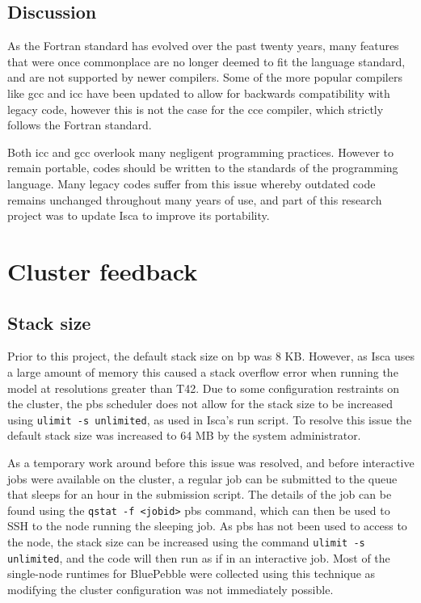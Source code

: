 \documentclass[a4paper,11pt]{report}
\begin{document}
\subsection{Discussion}
As the Fortran standard has evolved over the past twenty years, many features that were once commonplace are no longer deemed to fit the language standard, and are not supported by newer compilers. Some of the more popular compilers like \gls{gcc} and \gls{icc} have been updated to allow for backwards compatibility with legacy code, however this is not the case for the \gls{cce} compiler, which strictly follows the Fortran standard.
\par
Both \gls{icc} and \gls{gcc} overlook many negligent programming practices. However to remain portable, codes should be written to the standards of the programming language. Many legacy codes suffer from this issue whereby outdated code remains unchanged throughout many years of use, and part of this research project was to update Isca to improve its portability.


\section{Cluster feedback}
\subsection{Stack size}
Prior to this project, the default stack size on \gls{bp} was 8 KB. However, as Isca uses a large amount of memory this caused a stack overflow error when running the model at resolutions greater than T42. Due to some configuration restraints on the cluster, the \gls{pbs} scheduler does not allow for the stack size to be increased using \texttt{ulimit -s unlimited}, as used in Isca's run script. To resolve this issue the default stack size was increased to 64 MB by the system administrator.
\par
As a temporary work around before this issue was resolved, and before interactive jobs were available on the cluster, a regular job can be submitted to the queue that sleeps for an hour in the submission script. The details of the job can be found using the  \texttt{qstat -f <jobid>} \gls{pbs} command, which can then be used to SSH to the node running the sleeping job. As \gls{pbs} has not been used to access to the node, the stack size can be increased using the command \texttt{ulimit -s unlimited}, and the code will then run as if in an interactive job. Most of the single-node runtimes for BluePebble were collected using this technique as modifying the cluster configuration was not immediately possible. 
\end{document}
